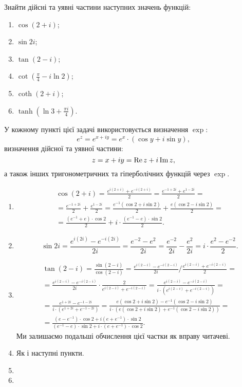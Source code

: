 \setcounter{problem}{67}
\begin{problem}
	Знайти дійсні та уявні частини наступних значень функцій:
	\begin{enumerate}
		\item $\cos (2 + i)$;
		\item $\sin 2 i$;
		\item $\tan (2 - i)$;
		\item $\cot \left( \frac\pi4 - i \ln 2 \right)$;
		\item $\coth (2 + i)$;
		\item $\tanh \left( \ln 3 + \frac{\pi i}4 \right)$.
	\end{enumerate}
\end{problem}
\begin{solution}
	У кожному пункті цієї задачі використовується визначення $\exp$:
	\begin{equation}
		\label{eq:1.3}
		e^z = e^{x + iy} = e^x \cdot (\cos y + i \sin y),
	\end{equation}
	визначення дійсної та уявної частини:
	\begin{equation}
		\label{eq:1.4}
		z = x + i y = \operatorname{Re} z + i \operatorname{Im} z,
	\end{equation}
	а також інших тригонометричних та гіперболічних функцій через $\exp$.
	\begin{enumerate}
		\item \begin{multline*}
			\cos (2 + i) = \frac{e^{i(2+i)}+e^{-i(2+i)}}{2} = \frac{e^{-1+2i}+e^{1-2i}}{2} = \\
			= \frac{e^{-1+2i}}{2}+\frac{e^{1-2i}}{2} = \frac{e^{-1}(\cos 2 + i \sin 2)}{2} + \frac{e(\cos 2 - i \sin 2)}{2} = \\
			= \frac{(e^{-1} + e)\cdot \cos 2}{2} + i \cdot \frac{(e^{-1} - e) \cdot \sin 2}{2}. 
		\end{multline*}
		\item \[\sin 2 i = \frac{e^{i(2i)}-e^{-i(2i)}}{2i} = \frac{e^{-2}-e^2}{2i} = \frac{e^{-2}}{2i}-\frac{e^2}{2i} = i \cdot \frac{e^2-e^{-2}}{2}. \]
		\item \begin{multline*}
			\tan (2 - i) = \frac{\sin (2 - i)}{\cos (2 - i)} = \frac{e^{i(2-i)}-e^{-i(2-i)}}{2i} / \frac{e^{i(2-i)}+e^{-i(2-i)}}{2} = \\
			= \frac{e^{i(2-i)}-e^{-i(2-i)}}{2i} \cdot \frac{2}{e^{i(2-i)}+e^{-i(2-i)}} = \frac{e^{i(2-i)}-e^{-i(2-i)}}{i \cdot (e^{i(2-i)}+e^{-i(2-i)})} = \\
			= \frac{e^{1+2i}-e^{-1-2i}}{i \cdot (e^{1+2i}+e^{-1-2i})} = \frac{e(\cos 2 + i \sin 2)-e^{-1} (\cos 2 - i \sin 2)}{i \cdot (e (\cos 2 + i \sin 2) + e^{-1} (\cos 2 - i \sin 2))} = \\
			= \frac{(e - e^{-1}) \cdot \cos 2 + i (e + e^{-1}) \cdot \sin 2}{(e^{-1} - e) \cdot \sin 2 + i \cdot (e + e^{-1}) \cdot \cos 2}.
		\end{multline*}
		Ми залишаємо подальші обчислення цієї частки як вправу читачеві.
		\item Як і наступні пункти.
		\item 
		\item 
	\end{enumerate}
\end{solution}

